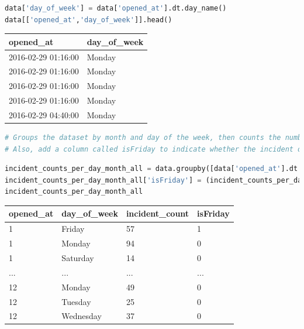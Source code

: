 \documentclass{article}
\begin{document}
\begin{lstlisting}[language=Python]
data['day_of_week'] = data['opened_at'].dt.day_name()
data[['opened_at','day_of_week']].head()
\end{lstlisting}

\begin{table}[H]
\centering
\begin{flushleft}
\begin{tabular}{|l|l|}
\hline
\textbf{opened\_at} & \textbf{day\_of\_week} \\
\hline
2016-02-29 01:16:00 & Monday \\
2016-02-29 01:16:00 & Monday \\
2016-02-29 01:16:00 & Monday \\
2016-02-29 01:16:00 & Monday \\
2016-02-29 04:40:00 & Monday \\
\hline
\end{tabular}
\end{flushleft}
\end{table}
\begin{lstlisting}[language=Python, breaklines=true]
# Groups the dataset by month and day of the week, then counts the number of incidents for each combination, returning the result in a new DataFrame with an incident_count column. 
# Also, add a column called isFriday to indicate whether the incident occurred on a Friday.
\end{lstlisting}

\begin{lstlisting}[language=Python, breaklines=true]
incident_counts_per_day_month_all = data.groupby([data['opened_at'].dt.month, 'day_of_week']).size().reset_index(name='incident_count')
incident_counts_per_day_month_all['isFriday'] = (incident_counts_per_day_month_all['day_of_week'] == 'Friday').astype(int)
incident_counts_per_day_month_all
\end{lstlisting}

\begin{table}[htbp]
\centering
\begin{flushleft}
\begin{tabular}{|l|l|l|l|}
\hline
\textbf{opened\_at} & \textbf{day\_of\_week} & \textbf{incident\_count} & \textbf{isFriday} \\
\hline
1  & Friday    & 57  & 1 \\
1  & Monday    & 94  & 0 \\
1  & Saturday  & 14  & 0 \\

... & ...      & ... & ... \\
12 & Monday    & 49  & 0 \\
12 & Tuesday   & 25  & 0 \\
12 & Wednesday & 37  & 0 \\
\hline
\end{tabular}
\end{flushleft}
\end{table}
\end{document}
